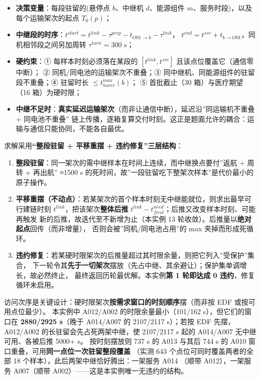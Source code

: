 \documentclass[
  10.5pt,
]{article}
\providecommand{\tightlist}{%
  \setlength{\itemsep}{0pt}\setlength{\parskip}{0pt}}
\begin{document}
\begin{itemize}
\tightlist
\item
  \textbf{决策变量}：每段驻留的(悬停点 \(b\)、中继机 \(d\)、能源组件
  \(m\)、服务时段)，以及每个运输架次的起点 \(T_0(p)\)；
\item
  \textbf{中继段的时序}：\(t^{start}=t^{link}-\tau^{prep}-t_{O01\to b}-\tau^{link}\)，
  \(t^{end}=t^{svc}+t_{b\to O01}\)，同机相邻段之间另加周转
  \(\tau^{turn}=300\) s；
\item
  \textbf{硬约束}：① 每样本时刻必须落在某段的 \([t^{link},t^{svc}]\)
  且该点位覆盖它（通信零中断）； ② 同机/同电池的运输架次不重叠；③
  同中继机、同能源组件的驻留段不重叠；④ 驻留时长
  \(\le t^{max}_{hover}(b)\)； ⑤ 首批截止（30 箱）与医疗期望（16
  箱）为硬时限；
\item
  \textbf{中继不足时}：\textbf{真实延迟运输架次}（而非让通信中断），延迟沿''同运输机不重叠
  + 同电池不重叠''
  链上传播，逐箱复算交付时刻。这正是题面允许的耦合：运输与通信只能协同，不能各自最优。
\end{itemize}

求解采用\textbf{``整段驻留 + 平移重摆 + 违约修复''三层结构}：

\begin{enumerate}
\def\labelenumi{\arabic{enumi}.}
\tightlist
\item
  \textbf{整段驻留}：同一架次的需中继样本在时间上连续，而中继换点要付''返航
  + 周转 + 再出航'' ≈1500 s
  的死时间，故''一段驻留吃下整架次样本''是代价最小的原子操作。
\item
  \textbf{平移重摆（不动点）}：若某架次的首个样本时刻无中继能就位，则求出最早可行建链时刻
  \(t^{link}\)，把该架次\textbf{整体后推}
  \(t^{link}-t^{need}_{first}\)；后推又改变样本时刻、可能再触发
  新的后推，故迭代至不新增为止（本实例 13
  轮收敛）。后推量以\textbf{绝对起点}回传（而非增量），
  否则会被''同机/同电池占用''的 max 夹掉而形成死循环。
\item
  \textbf{违约修复}：若某硬时限架次的后推量超过其时限余量，则把它列入''受保护''集合，
  下一轮令其\textbf{先于一切架次}摆放（先占中继、其余避让）；保护集单调增长，故必然终止，
  最终返回历轮最优解。本实例\textbf{第 1 轮即达成 0
  违约}，修复循环未启用。
\end{enumerate}

访问次序是关键设计：硬时限架次\textbf{按需求窗口的时刻顺序}摆（而非按
EDF 或按可用点位最少）。 本实例中 A012/A002 的时限余量最小（101/162
s），但它们的窗口在 \textbf{2880/2925 s}（晚于 A014/A007 的 2107/2117
s）；若按 EDF 先摆，A012/A002 的长驻留会先占死两架中继，使 2107/2117 s
起的 A014/A007 无中继可用、各被后推 5000+ s。 按时刻摆放则 737 s 的 A013
与其后 744 s 的 A010 窗口重叠，可用\textbf{同一点位一次驻留整段覆盖}
（实测 643 个点位可同时覆盖两者的全部 18
个样本），此后两架中继恰好腾出：一架服务 A014 （顺带 A012），一架服务
A007（顺带 A002）------这是本实例唯一无违约的结构。
\end{document}
